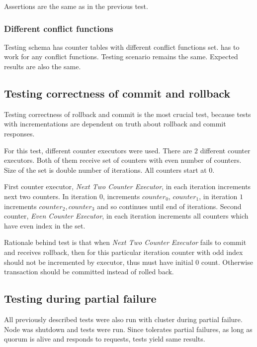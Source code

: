 Assertions are the same as in the previous test.

\subsubsection{Different conflict functions}
Testing schema has counter tables with different conflict functions set. \mpp has to work for any conflict functions. Testing scenario remains the same. Expected results are also the same.

\subsection{Testing correctness of commit and rollback}
Testing correctness of rollback and commit is the most crucial test, because tests with incrementations are dependent on truth about rollback and commit responses.

For this test, different counter executors were used. There are $2$ different counter executors. Both of them receive set of counters with even number of counters. Size of the set is double number of iterations. All counters start at $0$.

First counter executor, \emph{Next Two Counter Executor}, in each iteration increments next two counters. In iteration $0$, increments $counter_{0}$, $counter_{1}$, in iteration $1$ increments $counter_{2}, counter_{3}$ and so continues until end of iterations. Second counter, \emph{Even Counter Executor}, in each iteration increments all counters which have even index in the set.

Rationale behind test is that when \emph{Next Two Counter Executor} fails to commit and receives rollback, then for this particular iteration counter with odd index should not be incremented by executor, thus must have initial $0$ count. Otherwise transaction should be committed instead of rolled back.

\subsection{Testing during partial failure}
All previously described tests were also run with cluster during partial failure. Node was shutdown and tests were run. Since \mpp tolerates partial failures, as long as quorum is alive and responds to requests, tests yield same results.



